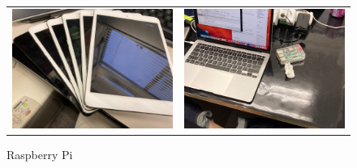 \begin{figure}[H]
\begin{tabular}{cc}
    \begin{minipage}[b]{0.40\columnwidth}
      \centering
      \includegraphics[width=\columnwidth]{./image/02-AboutSysken/iPad.jpg}
      \caption{タブレット端末}
    \end{minipage} &
    \hspace{0.04\columnwidth}
    \begin{minipage}[b]{0.40\columnwidth}
      \centering
      \includegraphics[width=\columnwidth]{./image/02-AboutSysken/RaspberryPi.jpg}
      \caption{Raspberry Pi}
    \end{minipage}
  \end{tabular}
\end{figure}

